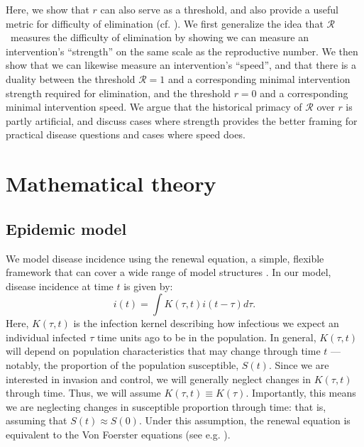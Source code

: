 \documentclass[12pt]{article}
\newcommand{\RR}{\ensuremath{{\mathcal R}}}
\begin{document}
Here, we show that $r$ can also serve as a threshold, and also provide a useful metric for difficulty of elimination (cf. \cite{ferretti2020quantifying}). We first generalize the idea that \RR\ measures the difficulty of elimination by showing we can measure an intervention's ``strength'' on the same scale as the reproductive number. 
We then show that we can likewise measure an intervention's ``speed'', and that there is a duality between the threshold $\RR=1$ and a corresponding minimal intervention strength required for elimination, and the threshold $r=0$ and a corresponding minimal intervention speed. 
We argue that the historical primacy of $\RR$ over $r$ is partly artificial, and discuss cases where strength provides the better framing for practical disease questions and cases where speed does.

\section{Mathematical theory}

\subsection{Epidemic model}

We model disease incidence using the renewal equation, a simple, flexible framework that can cover a wide range of model structures \citep{heesterbeek1996concept, diekmann2000mathematical, roberts2004modelling, aldis2005integral, wallinga2007generation, roberts2007model, Champredon2018equivalence}.
In our model, disease incidence at time $t$ is given by:
\begin{equation}
i(t) = \int K(\tau, t) i(t-\tau) d\tau.
\end{equation}
Here, $K(\tau, t)$ is the infection kernel describing how infectious we expect an individual infected $\tau$ time units ago to be in the population.
In general, $K(\tau, t)$ will depend on population characteristics that may change through time $t$ --- notably, the proportion of the population susceptible, $S(t)$.
Since we are interested in invasion and control, we will generally neglect changes in $K(\tau, t)$ through time.
Thus, we will assume $K(\tau, t) \equiv K(\tau)$.
Importantly, this means we are neglecting changes in susceptible proportion through time: that is, assuming that $S(t) \approx S(0)$.
Under this assumption, the renewal equation is equivalent to the Von Foerster equations (see e.g. \cite{fraser2004factors}).
\end{document}

